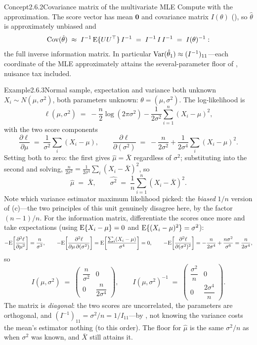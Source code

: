 \documentclass[main.tex]{subfiles}
\begin{document}
\begin{ObjL}{Concept}{2.6.2}{Covariance matrix of the multivariate MLE}
Compute with the approximation. The score vector has mean $\mathbf 0$ and covariance matrix
$I(\theta)$ (), so $\hat\theta$ is approximately unbiased and
\[ \operatorname{Cov}(\hat\theta) \;\approx\; I^{-1}\,\mathrm{E}\{U U^{\top}\}\, I^{-1}
   \;=\; I^{-1}\, I\, I^{-1} \;=\; I(\theta)^{-1} : \]
the full inverse information matrix. In particular
$\operatorname{Var}(\hat\theta_1)\approx (I^{-1})_{11}$---each coordinate of the MLE approximately attains
the several-parameter floor of , nuisance tax included.
\end{ObjL}

\begin{ObjL}{Example}{2.6.3}{Normal sample, expectation and variance both unknown}
$X_i\sim N(\mu,\sigma^2)$, both parameters unknown: $\theta=(\mu,\sigma^2)$. The
log-likelihood is
\[ \ell(\mu,\sigma^2) \;=\; -\frac{n}{2}\log(2\pi\sigma^2)
   -\frac{1}{2\sigma^2}\sum_{i=1}^n (X_i-\mu)^2 , \]
with the two score components
\[ \frac{\partial\ell}{\partial\mu} \;=\; \frac{1}{\sigma^2}\sum_i (X_i-\mu) , \qquad
   \frac{\partial\ell}{\partial(\sigma^2)} \;=\; -\frac{n}{2\sigma^2}
   +\frac{1}{2\sigma^4}\sum_i (X_i-\mu)^2 . \]
Setting both to zero: the first gives $\hat\mu=\bar X$ regardless of $\sigma^2$; substituting
into the second and solving, $\frac{n}{2\sigma^2}=\frac{1}{2\sigma^4}\sum_i(X_i-\bar X)^2$,
so
\[ \hat\mu \;=\; \bar X , \qquad
   \widehat{\sigma^2} \;=\; \frac1n\sum_{i=1}^n (X_i-\bar X)^2 . \]
Note which variance estimator maximum likelihood picked: the \emph{biased} $1/n$ version of
(c)---the two principles of this unit genuinely disagree here, by the factor
$(n-1)/n$. For the information matrix, differentiate the scores once more and take
expectations (using $\mathrm{E}\{X_i-\mu\}=0$ and $\mathrm{E}\{(X_i-\mu)^2\}=\sigma^2$):
\[ -\mathrm{E}\!\left[\frac{\partial^2 \ell}{\partial\mu^2}\right] = \frac{n}{\sigma^2}, \qquad
   -\mathrm{E}\!\left[\frac{\partial^2 \ell}{\partial\mu\,\partial(\sigma^2)}\right]
   = \mathrm{E}\!\left[\frac{\sum_i(X_i-\mu)}{\sigma^4}\right] = 0 , \qquad
   -\mathrm{E}\!\left[\frac{\partial^2 \ell}{\partial(\sigma^2)^2}\right]
   = -\frac{n}{2\sigma^4}+\frac{n\sigma^2}{\sigma^6} = \frac{n}{2\sigma^4} , \]
so
\[ I(\mu,\sigma^2) \;=\;
   \begin{pmatrix} \dfrac{n}{\sigma^2} & 0\\[6pt] 0 & \dfrac{n}{2\sigma^4} \end{pmatrix} ,
   \qquad
   I(\mu,\sigma^2)^{-1} \;=\;
   \begin{pmatrix} \dfrac{\sigma^2}{n} & 0\\[6pt] 0 & \dfrac{2\sigma^4}{n} \end{pmatrix} . \]
The matrix is \emph{diagonal}: the two scores are uncorrelated, the parameters are
orthogonal, and $(I^{-1})_{11}=\sigma^2/n=1/I_{11}$---by , not knowing the
variance costs the mean's estimator nothing (to this order). The floor for $\hat\mu$ is the
same $\sigma^2/n$ as when $\sigma^2$ was known, and $\bar X$ still attains it.
\end{ObjL}
\end{document}
